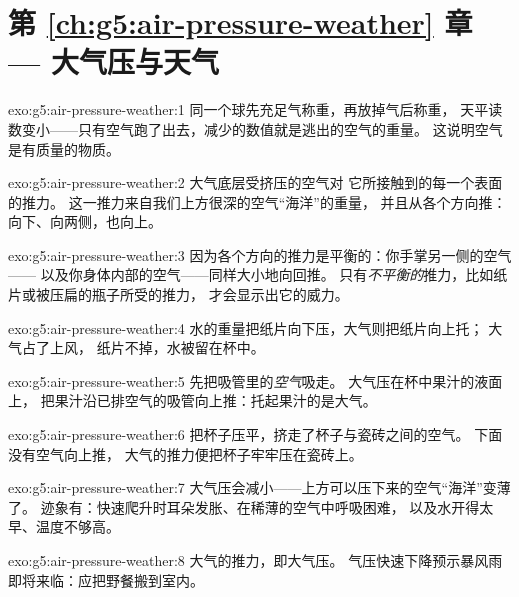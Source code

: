 \section*{第 \ref{ch:g5:air-pressure-weather} 章 --- 大气压与天气}

\begin{solution}{exo:g5:air-pressure-weather:1}
同一个球先充足气称重，再放掉气后称重，
天平读数变小——只有空气跑了出去，减少的数值就是逃出的空气的重量。
这说明空气是有质量的物质。
\end{solution}

\begin{solution}{exo:g5:air-pressure-weather:2}
大气底层受挤压的空气对
它所接触到的每一个表面的推力。
这一推力来自我们上方很深的空气“海洋”的重量，
并且从各个方向推：向下、向两侧，也向上。
\end{solution}

\begin{solution}{exo:g5:air-pressure-weather:3}
因为各个方向的推力是平衡的：你手掌另一侧的空气——
以及你身体内部的空气——同样大小地向回推。
只有\emph{不平衡的}推力，比如纸片或被压扁的瓶子所受的推力，
才会显示出它的威力。
\end{solution}

\begin{solution}{exo:g5:air-pressure-weather:4}
水的重量把纸片向下压，大气则把纸片向上托；
大气占了上风，
纸片不掉，水被留在杯中。
\end{solution}

\begin{solution}{exo:g5:air-pressure-weather:5}
先把吸管里的\emph{空气}吸走。
大气压在杯中果汁的液面上，
把果汁沿已排空气的吸管向上推：托起果汁的是大气。
\end{solution}

\begin{solution}{exo:g5:air-pressure-weather:6}
把杯子压平，挤走了杯子与瓷砖之间的空气。
下面没有空气向上推，
大气的推力便把杯子牢牢压在瓷砖上。
\end{solution}

\begin{solution}{exo:g5:air-pressure-weather:7}
大气压会减小——上方可以压下来的空气“海洋”变薄了。
迹象有：快速爬升时耳朵发胀、在稀薄的空气中呼吸困难，
以及水开得太早、温度不够高。
\end{solution}

\begin{solution}{exo:g5:air-pressure-weather:8}
大气的推力，即大气压。
气压快速下降预示暴风雨即将来临：应把野餐搬到室内。
\end{solution}

